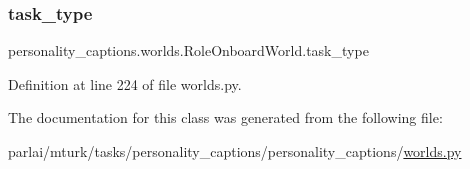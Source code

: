 \subsubsection{\texorpdfstring{task\+\_\+type}{task\_type}}
{\footnotesize\ttfamily personality\+\_\+captions.\+worlds.\+Role\+Onboard\+World.\+task\+\_\+type}



Definition at line 224 of file worlds.\+py.



The documentation for this class was generated from the following file\+:\begin{DoxyCompactItemize}
\item 
parlai/mturk/tasks/personality\+\_\+captions/personality\+\_\+captions/\hyperlink{parlai_2mturk_2tasks_2personality__captions_2personality__captions_2worlds_8py}{worlds.\+py}\end{DoxyCompactItemize}
